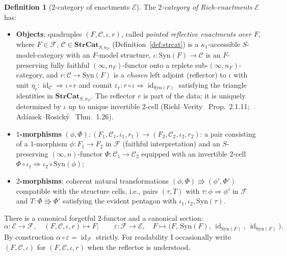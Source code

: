 \documentclass[11pt]{article}
\theoremstyle{plain}
\theoremstyle{definition}
\newtheorem{definition}[theorem]{Definition}
\newcommand{\cF}{\mathcal{F}}
\newcommand{\cC}{\mathcal{C}}
\newcommand{\Syn}{\mathrm{Syn}}
\newcommand{\cE}{\mathcal{E}}
\DeclareMathOperator{\id}{id}
\begin{document}
\begin{definition}[$2$-category of enactments $\cE$]\label{def:enactments}
The \emph{$2$-category of Rich-enactments} $\cE$ has:
\begin{itemize}
\item \textbf{Objects}: quadruples $(F, \cC, \iota, r)$, called \emph{pointed reflective enactments over $F$}, where $F \in \cF$, $\cC \in \mathbf{StrCat}_{S, n_F}$ (Definition~\ref{def:strcat}) is a $\kappa_1$-accessible $S$-model-category with an $F$-model structure, $\iota : \Syn(F) \to \cC$ is an $F$-preserving fully faithful $(\infty, n_F)$-functor onto a replete sub-$(\infty, n_F)$-category, and $r : \cC \to \Syn(F)$ is a \emph{chosen} left adjoint (reflector) to $\iota$ with unit $\eta_r : \id_\cC \Rightarrow \iota \circ r$ and counit $\varepsilon_r : r \circ \iota \Rightarrow \id_{\Syn(F)}$ satisfying the triangle identities in $\mathbf{StrCat}_{S, n_F}$. The reflector $r$ is part of the data; it is uniquely determined by $\iota$ up to unique invertible $2$-cell (Riehl--Verity~\cite{RiehlVerity2022} Prop.~2.1.11; Ad\'amek--Rosick\'y~\cite{AdamekRosicky1994} Thm.~1.26).
\item \textbf{$1$-morphisms} $(\phi, \Phi) : (F_1, \cC_1, \iota_1, r_1) \to (F_2, \cC_2, \iota_2, r_2)$: a pair consisting of a $1$-morphism $\phi : F_1 \to F_2$ in $\cF$ (faithful interpretation) and an $S$-preserving $(\infty, n)$-functor $\Phi : \cC_1 \to \cC_2$ equipped with an invertible $2$-cell $\Phi \circ \iota_1 \Rightarrow \iota_2 \circ \Syn(\phi)$;
\item \textbf{$2$-morphisms}: coherent natural transformations $(\phi, \Phi) \Rrightarrow (\phi', \Phi')$ compatible with the structure cells, i.e., pairs $(\tau, T)$ with $\tau : \phi \Rightarrow \phi'$ in $\cF$ and $T : \Phi \Rrightarrow \Phi'$ satisfying the evident pentagon with $\iota_1, \iota_2, \Syn(\tau)$.
\end{itemize}
There is a canonical forgetful $2$-functor and a canonical section:
\[
  \alpha : \cE \to \cF, \quad (F, \cC, \iota, r) \mapsto F; \qquad
  \varepsilon : \cF \to \cE, \quad F \mapsto \bigl(F,\, \Syn(F),\, \id_{\Syn(F)},\, \id_{\Syn(F)}\bigr).
\]
By construction $\alpha \circ \varepsilon = \id_\cF$ strictly. For readability I occasionally write $(F, \cC, \iota)$ for $(F, \cC, \iota, r)$ when the reflector is understood.
\end{definition}
\end{document}
